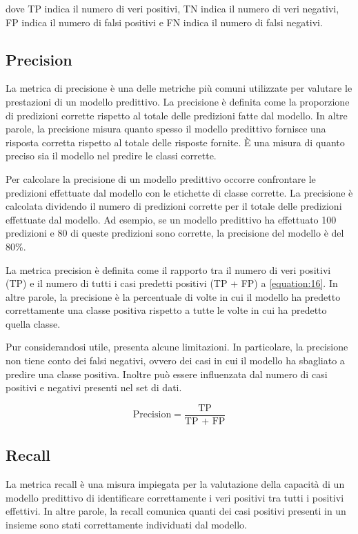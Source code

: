 dove TP indica il numero di veri positivi, TN indica il numero di veri negativi, FP indica il numero di falsi positivi e FN indica il numero di falsi negativi.

\subsection{Precision}
La metrica di precisione è una delle metriche più comuni utilizzate per valutare le prestazioni di un modello predittivo. La precisione è definita come la proporzione di predizioni corrette rispetto al totale delle predizioni fatte dal modello. In altre parole, la precisione misura quanto spesso il modello predittivo fornisce una risposta corretta rispetto al totale delle risposte fornite. È una misura di quanto preciso sia il modello nel predire le classi corrette.

Per calcolare la precisione di un modello predittivo occorre confrontare le predizioni effettuate dal modello con le etichette di classe corrette. La precisione è calcolata dividendo il numero di predizioni corrette per il totale delle predizioni effettuate dal modello. Ad esempio, se un modello predittivo ha effettuato 100 predizioni e 80 di queste predizioni sono corrette, la precisione del modello è del 80\%.

La metrica precision è definita come il rapporto tra il numero di veri positivi (TP) e il numero di tutti i casi predetti positivi (TP + FP) a \ref{equation:16}. In altre parole, la precisione è la percentuale di volte in cui il modello ha predetto correttamente una classe positiva rispetto a tutte le volte in cui ha predetto quella classe.

Pur considerandosi utile, presenta alcune limitazioni. In particolare, la precisione non tiene conto dei falsi negativi, ovvero dei casi in cui il modello ha sbagliato a predire una classe positiva. Inoltre può essere influenzata dal numero di casi positivi e negativi presenti nel set di dati.

\begin{equation}
    \text{Precision} = \frac{\text{TP}}{\text{TP + FP}}
    \label{equation:16}
\end{equation}

\subsection{Recall}
La metrica recall è una misura impiegata per la valutazione della capacità di un modello predittivo di identificare correttamente i veri positivi tra tutti i positivi effettivi. In altre parole, la recall comunica quanti dei casi positivi presenti in un insieme sono stati correttamente individuati dal modello.

